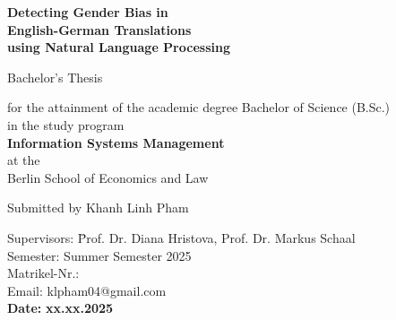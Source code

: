 \thispagestyle{empty}

\begin{center}

\vspace*{-10mm}

{\Large \textbf{Detecting Gender Bias in}}\\ 
\vspace*{2mm}
{\Large \textbf{English-German Translations}}\\ 
\vspace*{2mm}
{\Large \textbf{using Natural Language Processing}}\\

\vspace*{\fill} 

{\LARGE {Bachelor's Thesis}}\\ 

\vspace*{\fill} 

for the attainment of the academic degree Bachelor of Science (B.Sc.)\\ \vspace*{1.5mm} 
in the study program\\\vspace*{1.5mm}
\textbf{Information Systems Management}\\\vspace*{1.5mm}
at the\\\vspace*{1.5mm}
Berlin School of Economics and Law\\

\vspace*{\fill} 

{\Large Submitted by Khanh Linh Pham}\\[15mm]

\vspace*{\fill} 

\parbox{120mm}{
\begin{large}
\begin{tabbing}
Supervisors: \hspace{.7cm} \=Prof. Dr. Diana Hristova, Prof. Dr. Markus Schaal\\[4mm]
Semester:\> Summer Semester 2025\\
Matrikel-Nr.:\\
Email:\> klpham04@gmail.com\\[8mm]
\textbf{Date:} \> \textbf{xx.xx.2025}\\
\end{tabbing}
\end{large}
}

\end{center}

\clearpage{\pagestyle{empty}\cleardoublepage}